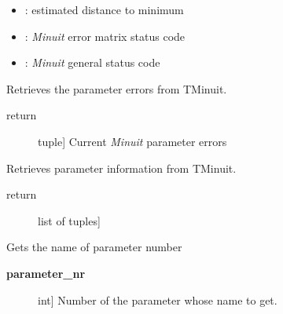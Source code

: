 \documentclass[a4paper,10pt,english]{sphinxmanual}
\begin{document}
\begin{fulllineitems}
\begin{fulllineitems}
\begin{description}
\begin{itemize}
\item {} 
: estimated distance to minimum

\item {} 
: \emph{Minuit} error matrix status code

\item {} 
: \emph{Minuit} general status code

\end{itemize}

\end{description}

\end{fulllineitems}


\begin{fulllineitems}
\label{index:kafe.minuit.Minuit.get_parameter_errors}
Retrieves the parameter errors from TMinuit.
\begin{description}
\item[{return}] \leavevmode{[}tuple{]}
Current \emph{Minuit} parameter errors

\end{description}

\end{fulllineitems}


\begin{fulllineitems}
\label{index:kafe.minuit.Minuit.get_parameter_info}
Retrieves parameter information from TMinuit.
\begin{description}
\item[{return}] \leavevmode{[}list of tuples{]}

\end{description}

\end{fulllineitems}


\begin{fulllineitems}
\label{index:kafe.minuit.Minuit.get_parameter_name}
Gets the name of parameter number 
\begin{description}
\item[{\textbf{parameter\_nr}}] \leavevmode{[}int{]}
Number of the parameter whose name to get.


\end{description}
\end{fulllineitems}
\end{fulllineitems}
\end{document}
